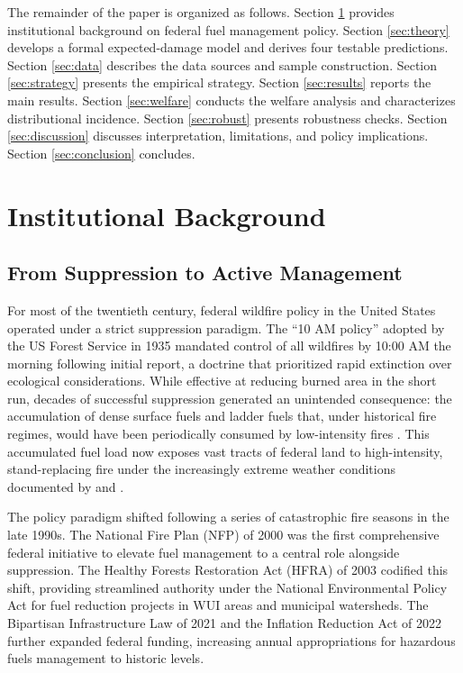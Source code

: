 \documentclass[12pt, letterpaper]{article}
\begin{document}
The remainder of the paper is organized as follows. Section \ref{sec:background} provides institutional background on federal fuel management policy. Section \ref{sec:theory} develops a formal expected-damage model and derives four testable predictions. Section \ref{sec:data} describes the data sources and sample construction. Section \ref{sec:strategy} presents the empirical strategy. Section \ref{sec:results} reports the main results. Section \ref{sec:welfare} conducts the welfare analysis and characterizes distributional incidence. Section \ref{sec:robust} presents robustness checks. Section \ref{sec:discussion} discusses interpretation, limitations, and policy implications. Section \ref{sec:conclusion} concludes.


\section{Institutional Background}\label{sec:background}

\subsection{From Suppression to Active Management}

For most of the twentieth century, federal wildfire policy in the United States operated under a strict suppression paradigm. The ``10 AM policy'' adopted by the US Forest Service in 1935 mandated control of all wildfires by 10:00 AM the morning following initial report, a doctrine that prioritized rapid extinction over ecological considerations. While effective at reducing burned area in the short run, decades of successful suppression generated an unintended consequence: the accumulation of dense surface fuels and ladder fuels that, under historical fire regimes, would have been periodically consumed by low-intensity fires \citep{agee2005, stephens2012}. This accumulated fuel load now exposes vast tracts of federal land to high-intensity, stand-replacing fire under the increasingly extreme weather conditions documented by \citet{abatzoglou2016} and \citet{brown2023}.

The policy paradigm shifted following a series of catastrophic fire seasons in the late 1990s. The National Fire Plan (NFP) of 2000 was the first comprehensive federal initiative to elevate fuel management to a central role alongside suppression. The Healthy Forests Restoration Act (HFRA) of 2003 codified this shift, providing streamlined authority under the National Environmental Policy Act for fuel reduction projects in WUI areas and municipal watersheds. The Bipartisan Infrastructure Law of 2021 and the Inflation Reduction Act of 2022 further expanded federal funding, increasing annual appropriations for hazardous fuels management to historic levels.
\end{document}
